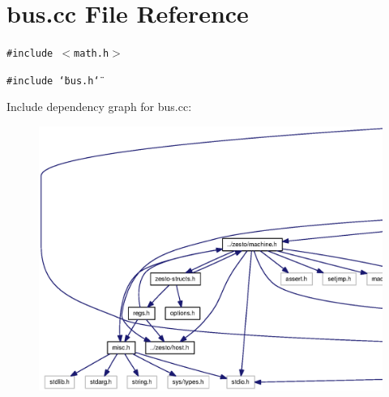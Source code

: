 \section{bus.cc File Reference}
\label{bus_8cc}
{\tt \#include $<$math.h$>$}\par
{\tt \#include \char`\"{}bus.h\char`\"{}}\par


Include dependency graph for bus.cc:\nopagebreak
\begin{figure}[H]
\begin{center}
\leavevmode
\includegraphics[width=420pt]{bus_8cc__incl}
\end{center}
\end{figure}
